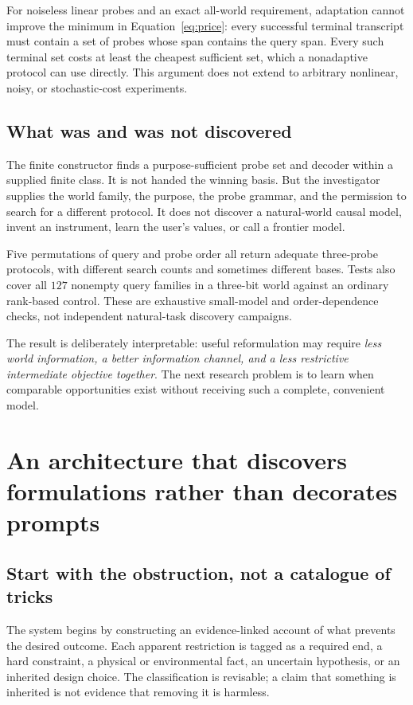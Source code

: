 \documentclass[11pt,letterpaper]{article}
\theoremstyle{remark}\newtheorem{remark}{Remark}[section]
\begin{document}
For noiseless linear probes and an exact all-world requirement, adaptation cannot improve the minimum in Equation~\eqref{eq:price}: every successful terminal transcript must contain a set of probes whose span contains the query span. Every such terminal set costs at least the cheapest sufficient set, which a nonadaptive protocol can use directly. This argument does not extend to arbitrary nonlinear, noisy, or stochastic-cost experiments.

\subsection{What was and was not discovered}
The finite constructor finds a purpose-sufficient probe set and decoder within a supplied finite class. It is not handed the winning basis. But the investigator supplies the world family, the purpose, the probe grammar, and the permission to search for a different protocol. It does not discover a natural-world causal model, invent an instrument, learn the user's values, or call a frontier model.

Five permutations of query and probe order all return adequate three-probe protocols, with different search counts and sometimes different bases. Tests also cover all $127$ nonempty query families in a three-bit world against an ordinary rank-based control. These are exhaustive small-model and order-dependence checks, not independent natural-task discovery campaigns.

The result is deliberately interpretable: useful reformulation may require \emph{less world information, a better information channel, and a less restrictive intermediate objective together}. The next research problem is to learn when comparable opportunities exist without receiving such a complete, convenient model.

\section{An architecture that discovers formulations rather than decorates prompts}\label{sec:architecture}
\subsection{Start with the obstruction, not a catalogue of tricks}
The system begins by constructing an evidence-linked account of what prevents the desired outcome. Each apparent restriction is tagged as a required end, a hard constraint, a physical or environmental fact, an uncertain hypothesis, or an inherited design choice. The classification is revisable; a claim that something is inherited is not evidence that removing it is harmless.
\end{document}
